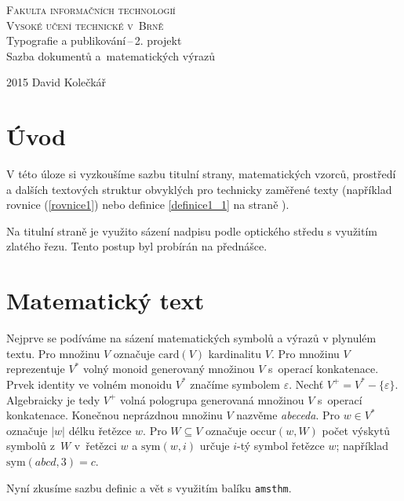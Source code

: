 \documentclass[a4paper,11pt,twocolumn]{article}
\theoremstyle{definition}
\theoremstyle{plain}
\theoremstyle{definition}
\begin{document}
\begin{titlepage}

\begin{center}
\textsc{\Huge{Fakulta informačních technologií}}\\
\textsc{\Huge{Vysoké učení technické v~Brně}}\\
\LARGE{Typografie a publikování\,--\,2. projekt}\\
\LARGE{Sazba dokumentů a~matematických výrazů}
\end{center}

{\Large 2015 \hfill David Kolečkář}

\end{titlepage}

\section*{Úvod}
V této úloze si vyzkoušíme sazbu titulní strany, matematických vzorců, prostředí a dalších textových struktur obvyklých pro technicky zaměřené texty (například rovnice (\ref{rovnice1}) nebo definice \ref{definice1_1} na straně \pageref{definice1_1}).\par
\par
Na titulní straně je využito sázení nadpisu podle optického středu s využitím zlatého řezu. Tento postup byl probírán na přednášce.
\par

\section{Matematický text}
Nejprve se podíváme na sázení matematických symbolů a výrazů v plynulém textu. 
Pro množinu $V$ označuje $\mbox{card}(V)$ kardinalitu $V$.
Pro množinu $V$ reprezentuje $V^\ast$ volný monoid generovaný množinou $V$ s~operací konkatenace.
Prvek identity ve volném monoidu $V^\ast$ značíme symbolem $\varepsilon$.
Nechť $V^+ = V^* - \{\varepsilon\}$. Algebraicky je tedy $V^+$ volná pologrupa generovaná množinou $V$ s~operací konkatenace.
Konečnou neprázdnou množinu $V$ nazvěme \emph{abeceda}.
Pro $\mathit{w} \in V^*$ označuje $|w|$ délku řetězce $w$. Pro $W \subseteq V$ označuje $\mbox{occur}(w, W)$ počet výskytů symbolů z~$W$ v~řetězci $w$ a $\mbox{sym}(w, i)$ určuje $i$-tý symbol řetězce $w$; například $\mbox{sym}(abcd, 3) = c$.
\par
Nyní zkusíme sazbu definic a vět s využitím balíku \texttt{amsthm}.
\end{document}
